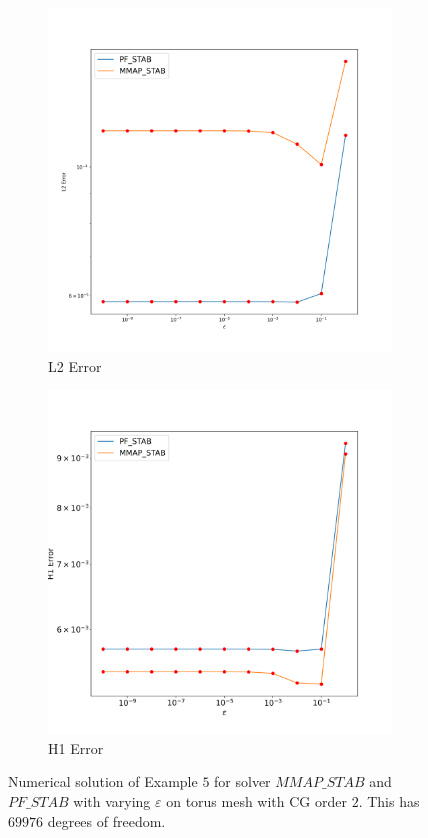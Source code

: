 \documentclass[12pt]{ociamthesis}
\begin{document}
\begin{figure}[H]
 \begin{subfigure}{0.5\textwidth}
     \includegraphics[width=\textwidth]{Pics/LHSims/E5/E5_STABL2.png}
     \caption{L2 Error}
 \end{subfigure}
   \begin{subfigure}{0.5\textwidth}
     \includegraphics[width=\textwidth]{Pics/LHSims/E5/E5_STABH1.png}
     \caption{H1 Error}
 \end{subfigure}
 \caption{Numerical solution of Example $5$ for solver $MMAP\_STAB$ and $PF\_STAB$ with varying $\varepsilon$ on torus mesh with CG order $2$. This has $69976$ degrees of freedom.} \label{E5_eps}
\end{figure}
\end{document}
